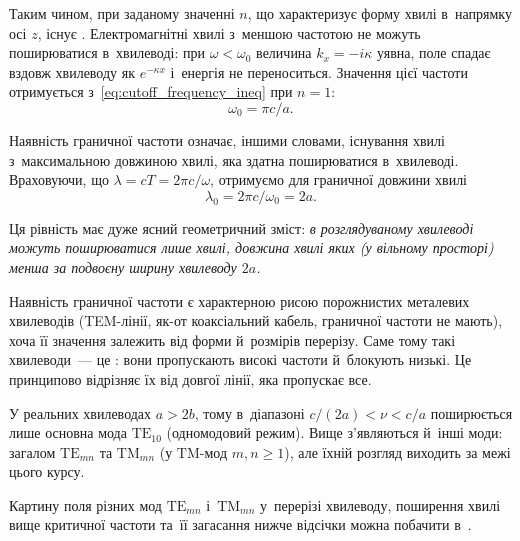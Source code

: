 Таким чином, при заданому значенні $n$, що характеризує форму хвилі в~напрямку осі $z$, існує . Електромагнітні хвилі з~меншою частотою не можуть поширюватися в~хвилеводі: при $\omega<\omega_0$ величина $k_x=-i\kappa$ уявна, поле спадає вздовж хвилеводу як $e^{-\kappa x}$ і~енергія не переноситься. Значення цієї частоти отримується з~\eqref{eq:cutoff_frequency_ineq} при $n = 1$:
\begin{equation}
	\omega_0 = \pi c / a.
	\label{eq:cutoff_frequency}
\end{equation}

Наявність граничної частоти означає, іншими словами, існування хвилі з~максимальною довжиною хвилі, яка здатна поширюватися в~хвилеводі. Враховуючи, що $\lambda = cT = 2\pi c/\omega$, отримуємо для граничної довжини хвилі
\begin{equation}
	\lambda_0 = 2\pi c / \omega_0 = 2a.
	\label{eq:cutoff_wavelength}
\end{equation}

Ця рівність має дуже ясний геометричний зміст: \emph{в розглядуваному хвилеводі можуть поширюватися лише хвилі, довжина хвилі яких (у вільному просторі) менша за подвоєну ширину хвилеводу $2a$.}


Наявність граничної частоти є характерною рисою порожнистих металевих хвилеводів (TEM-лінії, як-от коаксіальний кабель, граничної частоти не мають), хоча її значення залежить від форми й~розмірів перерізу. Саме тому такі хвилеводи~--- це : вони пропускають високі частоти й~блокують низькі. Це принципово відрізняє їх від довгої лінії, яка пропускає все.

У реальних хвилеводах $a>2b$, тому в~діапазоні $c/(2a)<\nu<c/a$ поширюється лише основна мода $\text{TE}_{10}$ (одномодовий режим). Вище з'являються й~інші моди: загалом $\text{TE}_{mn}$ та $\text{TM}_{mn}$ (у $\text{TM}$-мод $m,n\geqslant1$), але їхній розгляд виходить за межі цього курсу.


\begin{Simulation}
Картину поля різних мод $\text{TE}_{mn}$ і~$\text{TM}_{mn}$ у~перерізі хвилеводу, поширення
хвилі вище критичної частоти та~її загасання нижче відсічки можна побачити
в~.
\end{Simulation}


